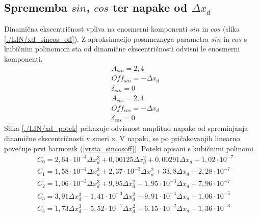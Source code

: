 \subsection{Sprememba $sin$, $cos$ ter napake od $\Delta x_d$}
Dinamična ekscentričnost vpliva na enosmerni komponenti $sin$ in $cos$ (slika \ref{./LIN/xd_sincos_off}).
Z aproksimacijo posameznega parametra $sin$ in $cos$ s kubičnim polinomom sta od dinamične ekscentričnosti odvisni le enosmerni komponenti.
\begin{eqnarray}
\label{analog_lin_xd}
&A_{sin} = 2,4\\
&Off_{sin} = -\Delta x_d \\
&\delta_{sin} =0 \\
&A_{cos} = 2,4\\
&Off_{cos} = -\Delta x_d\\
&\delta_{cos} = 0
\end{eqnarray}
Slika \ref{./LIN/xd_potek} prikazuje odvisnost amplitud napake od spreminjanja dinamične ekscentričnosti v smeri x. V napaki, se po pričakovanjih linearno povečuje prvi harmonik (\ref{vrsta_sincosoff}).
Poteki opisani s kubičnimi polinomi.
\begin{eqnarray}
\label{nap_lin_xd}
&C_0 =2,64\cdot 10^{-4}\Delta x_d^{3}+0,00125\Delta x_d^{2}+0,00291\Delta x_d+1,02\cdot 10^{-7} \\
&C_1 =1,58\cdot 10^{-4}\Delta x_d^{3}+2,37\cdot 10^{-3}\Delta x_d^{2}+33,8\Delta x_d+2,28\cdot 10^{-7} \\     
&C_2 =1,06\cdot 10^{-3}\Delta x_d^{3}+9,95\Delta x_d^{2}-1,95\cdot 10^{-3}\Delta x_d+7,96\cdot 10^{-7} \\             
&C_3 =3,91\Delta x_d^{3}-1,41\cdot 10^{-3}\Delta x_d^{2}+9,91\cdot 10^{-4}\Delta x_d+1,06\cdot 10^{-5} \\               
&C_4 =1,73\Delta x_d^{3}-5,52\cdot 10^{-1}\Delta x_d^{2}+6,15\cdot 10^{-2}\Delta x_d-1,36\cdot 10^{-3}            
\end{eqnarray}
